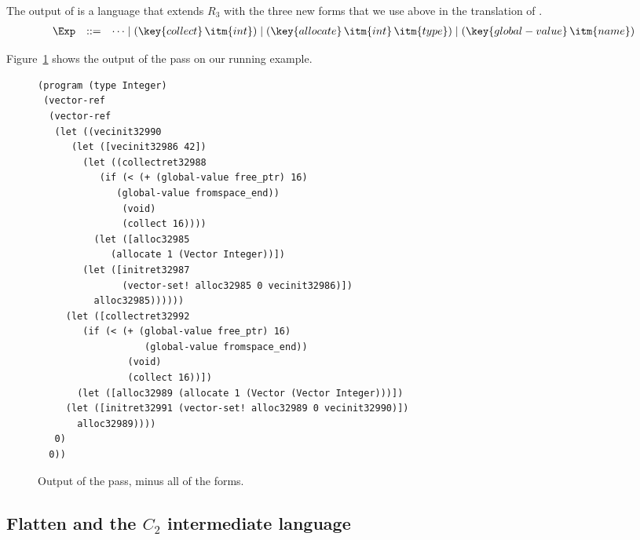 \documentclass[11pt]{book}
\begin{document}
The output of  is a language that extends
$R_3$ with the three new forms that we use above in the translation of
.
\[
\begin{array}{lcl}
  \Exp &::=& \cdots
      \mid (\key{collect} \,\itm{int})
      \mid (\key{allocate} \,\itm{int}\,\itm{type})
      \mid (\key{global-value} \,\itm{name})
\end{array}
\]

%


Figure~\ref{fig:expose-alloc-output} shows the output of the
 pass on our running example.

\begin{figure}[tbp]
\begin{lstlisting}
(program (type Integer)
 (vector-ref
  (vector-ref
   (let ((vecinit32990
	  (let ([vecinit32986 42])
	    (let ((collectret32988
		   (if (< (+ (global-value free_ptr) 16)
			  (global-value fromspace_end))
		       (void)
		       (collect 16))))
	      (let ([alloc32985
		     (allocate 1 (Vector Integer))])
		(let ([initret32987
		       (vector-set! alloc32985 0 vecinit32986)])
		  alloc32985))))))
     (let ([collectret32992
	    (if (< (+ (global-value free_ptr) 16)
                   (global-value fromspace_end))
                (void)
                (collect 16))])
       (let ([alloc32989 (allocate 1 (Vector (Vector Integer)))])
	 (let ([initret32991 (vector-set! alloc32989 0 vecinit32990)])
	   alloc32989))))
   0)
  0))
\end{lstlisting}
\caption{Output of the  pass, minus
  all of the  forms.}
\label{fig:expose-alloc-output}
\end{figure}


\clearpage

\subsection{Flatten and the $C_2$ intermediate language}
\label{sec:flatten-gc}
\end{document}
